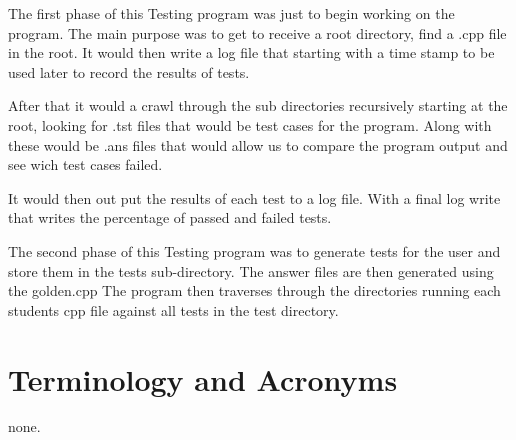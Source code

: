 The first phase of this Testing program was just to begin working on the program.
The main purpose was to get to receive a root directory, find a .cpp file
in the root. It would then write a log file that starting with a time stamp to
be used later to record the results of tests.
	
	After that it would a crawl through the sub directories recursively
starting at the root, looking for .tst files that would be test cases for 
the program. Along with these would be .ans files that would allow us to
compare the program output and see wich test cases failed. 
	
	It would then out put the results of each test to a log file. With a final
log write that writes the percentage of passed and failed tests.

The second phase of this Testing program was to generate tests for the user and store them in the tests sub-directory. The answer files are then generated using the golden.cpp
The program then traverses through the directories running each students cpp file against all tests in the test directory.

\section{Terminology and Acronyms}
none. 
